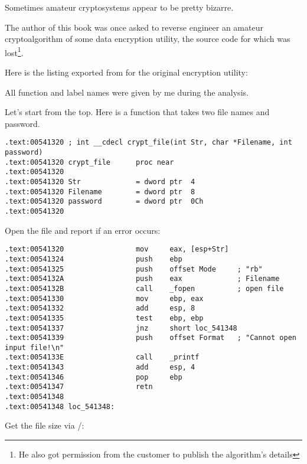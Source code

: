 
Sometimes amateur cryptosystems appear to be pretty bizarre.

The author of this book was once asked to reverse engineer an amateur cryptoalgorithm of some data encryption utility, 
the source code for which was lost\footnote{He also got permission from the customer to publish the algorithm's details}.

Here is the listing exported from \IDA for the original encryption utility:



All function and label names were given by me during the analysis.

Let's start from the top. Here is a function that takes two file names and password.

\begin{lstlisting}[style=customasmx86]
.text:00541320 ; int __cdecl crypt_file(int Str, char *Filename, int password)
.text:00541320 crypt_file      proc near
.text:00541320
.text:00541320 Str             = dword ptr  4
.text:00541320 Filename        = dword ptr  8
.text:00541320 password        = dword ptr  0Ch
.text:00541320
\end{lstlisting}

Open the file and report if an error occurs:

\begin{lstlisting}[style=customasmx86]
.text:00541320                 mov     eax, [esp+Str]
.text:00541324                 push    ebp
.text:00541325                 push    offset Mode     ; "rb"
.text:0054132A                 push    eax             ; Filename
.text:0054132B                 call    _fopen          ; open file
.text:00541330                 mov     ebp, eax
.text:00541332                 add     esp, 8
.text:00541335                 test    ebp, ebp
.text:00541337                 jnz     short loc_541348
.text:00541339                 push    offset Format   ; "Cannot open input file!\n"
.text:0054133E                 call    _printf
.text:00541343                 add     esp, 4
.text:00541346                 pop     ebp
.text:00541347                 retn
.text:00541348
.text:00541348 loc_541348:
\end{lstlisting}

Get the file size via /:


